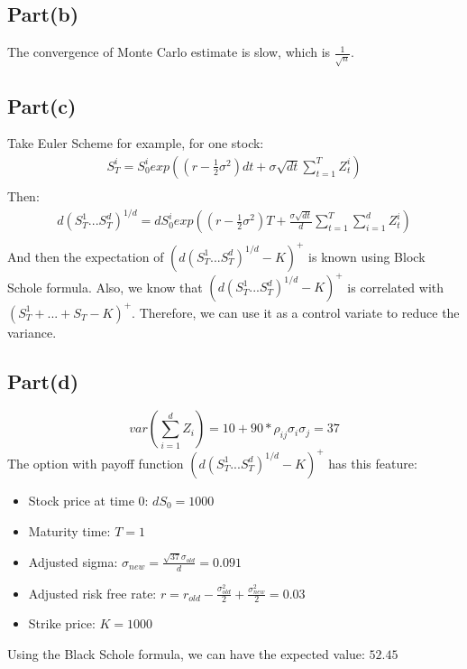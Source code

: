 \documentclass{report}
\begin{document}
\subsection*{Part(b)}
The convergence of Monte Carlo estimate is slow, which is $\frac{1}{\sqrt{n}} $.

\subsection*{Part(c)}
Take Euler Scheme for example, for one stock: 
\begin{align*} 
S_T^i=S_0^iexp\left(\left(r-\frac{1}{2}\sigma^2\right)dt+\sigma\sqrt{dt}\sum_{t=1}^{T}Z_t^i\right)\\
\end{align*}
Then: 
\begin{align*}
d(S_T^1...S_T^d)^{1/d}=dS_0^iexp\left(\left(r-\frac{1}{2}\sigma^2\right)T+\frac{\sigma\sqrt{dt}}{d}\sum_{t=1}^{T}\sum_{i=1}^{d}Z_t^i\right)\\
\end{align*}
And then the expectation of $\left(d(S_T^1...S_T^d)^{1/d}-K\right)^+$ is known using Block Schole formula. 
Also, we know that  $\left(d(S_T^1...S_T^d)^{1/d}-K\right)^+$ is correlated with $\left(S_T^1+...+S_T-K\right)^+$. Therefore, we can use it as a control variate to reduce the variance. 

\subsection*{Part(d)} 
$$ var(\sum_{i=1}^{d}Z_i)  = 10 + 90*\rho_{ij}\sigma_i\sigma_j=37 $$ 
The option with payoff function $\left(d(S_T^1...S_T^d)^{1/d}-K\right)^+$ has this feature: \\
\begin{itemize} 
\item Stock price at time 0:  $dS_0=1000$\\
\item Maturity time: $T=1$ \\
\item Adjusted sigma: $\sigma_{new}= \frac{\sqrt{37}\sigma_{old}}{d} = 0.091 $
\item Adjusted risk free rate: $r=r_{old}-\frac{\sigma_{old}^2}{2}+\frac{\sigma_{new}^2}{2}= 0.03 $
\item Strike price:  $ K = 1000 $
\end{itemize}

Using the Black Schole formula, we can have the expected value:  $52.45 $
\end{document}

